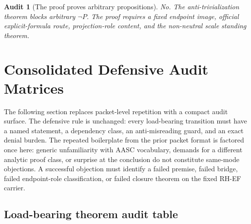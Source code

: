 \documentclass[11pt]{article}
\newtheorem{audit}{Audit}[section]
\begin{document}
\begin{audit}[The proof proves arbitrary propositions]
No.  The anti-trivialization theorem blocks arbitrary \(\neg P\).  The proof requires a fixed endpoint image, official explicit-formula route, projection-role content, and the non-neutral scale standing theorem.
\end{audit}


\section{Consolidated Defensive Audit Matrices}

The following section replaces packet-level repetition with a compact audit surface.  The defensive rule is unchanged: every load-bearing transition must have a named statement, a dependency class, an anti-misreading guard, and an exact denial burden.  The repeated boilerplate from the prior packet format is factored once here: generic unfamiliarity with AASC vocabulary, demands for a different analytic proof class, or surprise at the conclusion do not constitute same-mode objections.  A successful objection must identify a failed premise, failed bridge, failed endpoint-role classification, or failed closure theorem on the fixed RH-EF carrier.

\subsection{Load-bearing theorem audit table}
\end{document}
